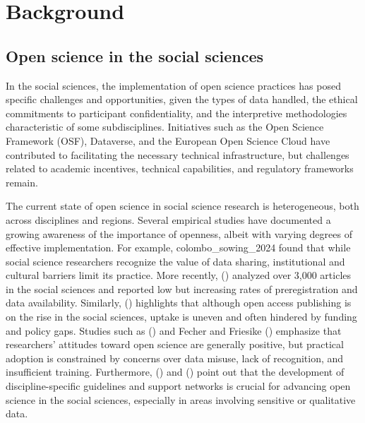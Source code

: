 \documentclass[
  english,
  letterpaper,
]{article}
\begin{document}
\section{Background}\label{background}

\subsection{Open science in the social
sciences}\label{open-science-in-the-social-sciences}

In the social sciences, the implementation of open science practices has
posed specific challenges and opportunities, given the types of data
handled, the ethical commitments to participant confidentiality, and the
interpretive methodologies characteristic of some subdisciplines.
Initiatives such as the Open Science Framework (OSF), Dataverse, and the
European Open Science Cloud have contributed to facilitating the
necessary technical infrastructure, but challenges related to academic
incentives, technical capabilities, and regulatory frameworks remain.

The current state of open science in social science research is
heterogeneous, both across disciplines and regions. Several empirical
studies have documented a growing awareness of the importance of
openness, albeit with varying degrees of effective implementation. For
example, colombo\_sowing\_2024 found that while social science
researchers recognize the value of data sharing, institutional and
cultural barriers limit its practice. More recently,
()
analyzed over 3,000 articles in the social sciences and reported low but
increasing rates of preregistration and data availability. Similarly,
()
highlights that although open access publishing is on the rise in the
social sciences, uptake is uneven and often hindered by funding and
policy gaps. Studies such as
()
and Fecher and Friesike ()
emphasize that researchers' attitudes toward open science are generally
positive, but practical adoption is constrained by concerns over data
misuse, lack of recognition, and insufficient training. Furthermore,
() and
()
point out that the development of discipline-specific guidelines and
support networks is crucial for advancing open science in the social
sciences, especially in areas involving sensitive or qualitative data.
\end{document}
